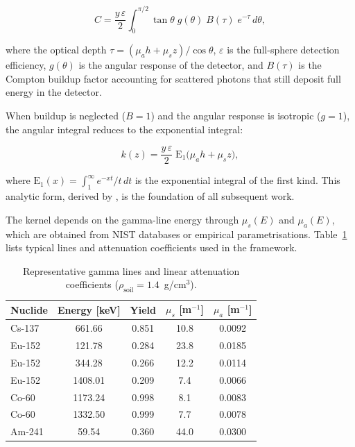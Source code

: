 \documentclass[a4paper,11pt]{article}
\newcommand{\Eone}{\mathrm{E}_1}
\begin{document}
\begin{equation}\label{eq:full_kernel}
  C = \frac{y\,\varepsilon}{2}\int_0^{\pi/2}\!
      \tan\theta\; g(\theta)\; B(\tau)\; e^{-\tau}\, d\theta,
\end{equation}

where the optical depth $\tau = (\mu_a h + \mu_s z)/\cos\theta$, $\varepsilon$
is the full-sphere detection efficiency, $g(\theta)$ is the angular
response of the detector, and $B(\tau)$ is the Compton buildup factor
accounting for scattered photons that still deposit full energy in the
detector.

When buildup is neglected ($B=1$) and the angular response is isotropic
($g=1$), the angular integral reduces to the exponential integral:

\begin{equation}\label{eq:analytic}
  k(z) = \frac{y\,\varepsilon}{2}\;\Eone\bigl(\mu_a h + \mu_s z\bigr),
\end{equation}

where $\Eone(x) = \int_1^\infty e^{-xt}/t\, dt$ is the exponential
integral of the first kind.  This analytic form, derived by
\citet{beck1968deconvolution}, is the foundation of all subsequent work.

The kernel depends on the gamma-line energy through $\mu_s(E)$ and
$\mu_a(E)$, which are obtained from NIST databases or empirical
parametrisations.  Table~\ref{tab:lines} lists typical lines and
attenuation coefficients used in the framework.

\begin{table}[htbp]
\centering
\caption{Representative gamma lines and linear attenuation coefficients
(\(\rho_{\mathrm{soil}} = 1.4\)~g/cm$^3$).}
\label{tab:lines}
\begin{tabular}{lcccc}
\toprule
Nuclide & Energy [keV] & Yield & $\mu_s$ [m$^{-1}$] & $\mu_a$ [m$^{-1}$] \\
\midrule
Cs-137 & 661.66 & 0.851 & 10.8 & 0.0092 \\
Eu-152 & 121.78 & 0.284 & 23.8 & 0.0185 \\
Eu-152 & 344.28 & 0.266 & 12.2 & 0.0114 \\
Eu-152 & 1408.01 & 0.209 & 7.4  & 0.0066 \\
Co-60  & 1173.24 & 0.998 & 8.1  & 0.0083 \\
Co-60  & 1332.50 & 0.999 & 7.7  & 0.0078 \\
Am-241 & 59.54  & 0.360 & 44.0 & 0.0300 \\
\bottomrule
\end{tabular}
\end{table}
\end{document}
